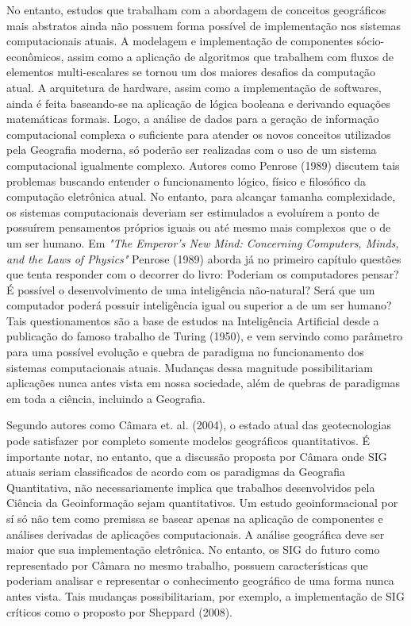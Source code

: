No entanto, estudos que trabalham com a abordagem de conceitos geográficos mais abstratos ainda não possuem forma possível de implementação nos sistemas computacionais atuais. A modelagem e implementação de componentes sócio-econômicos, assim como a aplicação de algoritmos que trabalhem com fluxos de elementos multi-escalares se tornou um dos maiores desafios da computação atual. A arquitetura de hardware, assim como a implementação de softwares, ainda é feita baseando-se na aplicação de lógica booleana e derivando equações matemáticas formais. Logo, a análise de dados para a geração de informação computacional complexa o suficiente para atender os novos conceitos utilizados pela Geografia moderna, só poderão ser realizadas com o uso de um sistema computacional igualmente complexo. Autores como Penrose (1989) discutem tais problemas buscando entender o funcionamento lógico, físico e filosófico da computação eletrônica atual. No entanto, para alcançar tamanha complexidade, os sistemas computacionais deveriam ser estimulados a evoluírem a ponto de possuírem pensamentos próprios iguais ou até mesmo mais complexos que o de um ser humano. Em \textit{"The Emperor's New Mind: Concerning Computers, Minds, and the Laws of Physics"} Penrose (1989) aborda já no primeiro capítulo questões que tenta responder com o decorrer do livro: Poderiam os computadores pensar? É possível o desenvolvimento de uma inteligência não-natural? Será que um computador poderá possuir inteligência igual ou superior a de um ser humano? Tais questionamentos são a base de estudos na Inteligência Artificial desde a publicação do famoso trabalho de Turing (1950), e vem servindo como parâmetro para uma possível evolução e quebra de paradigma no funcionamento dos sistemas computacionais atuais. Mudanças dessa magnitude possibilitariam aplicações nunca antes vista em nossa sociedade, além de quebras de paradigmas em toda a ciência, incluindo a Geografia.

Segundo autores como Câmara et. al. (2004), o estado atual das geotecnologias pode satisfazer por completo somente modelos geográficos quantitativos. É importante notar, no entanto, que a discussão proposta por Câmara onde SIG atuais seriam classificados de acordo com os paradigmas da Geografia Quantitativa, não necessariamente implica que trabalhos desenvolvidos pela Ciência da Geoinformação sejam quantitativos. Um estudo geoinformacional por sí só não tem como premissa se basear apenas na aplicação de componentes e análises derivadas de aplicações computacionais. A análise geográfica deve ser maior que sua implementação eletrônica. No entanto, os SIG do futuro como representado por Câmara no mesmo trabalho, possuem características que poderiam analisar e representar o conhecimento geográfico de uma forma nunca antes vista. Tais mudanças possibilitariam, por exemplo, a implementação de SIG críticos como o proposto por Sheppard (2008).

